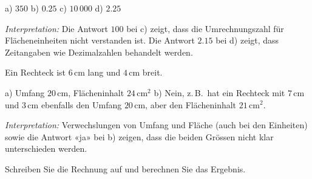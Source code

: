 \documentclass[11pt]{exam}
\newcommand{\aufgabe}[1]{%
  \needspace{8\baselineskip}%
  \renewcommand{\questionlabel}{\textbf{#1}}%
  \question}
\newcommand{\raum}[1]{\ifprintanswers\else\fillwithgrid{#1}\fi}
\newcommand{\diagnose}[1]{\par\smallskip\textit{Interpretation:} #1}
\begin{document}
\begin{questions}
\begin{solution}
  a) $350$ \quad b) $0.25$ \quad c) $10\,000$ \quad d) $2.25$
  \diagnose{Die Antwort $100$ bei c) zeigt, dass die Umrechnungszahl für
  Flächeneinheiten nicht verstanden ist. Die Antwort $2.15$ bei d) zeigt, dass
  Zeitangaben wie Dezimalzahlen behandelt werden.}
\end{solution}

\aufgabe{8.2}
Ein Rechteck ist $6$\,cm lang und $4$\,cm breit.
\begin{solution}
  a) Umfang $20$\,cm, Flächeninhalt $24$\,cm$^2$
  \qquad b) Nein, z.\,B.\ hat ein Rechteck mit $7$\,cm und $3$\,cm ebenfalls den
  Umfang $20$\,cm, aber den Flächeninhalt $21$\,cm$^2$.
  \diagnose{Verwechslungen von Umfang und Fläche (auch bei den Einheiten) sowie
  die Antwort «ja» bei b) zeigen, dass die beiden Grössen nicht klar
  unterschieden werden.}
\end{solution}
\raum{3.5cm}

\aufgabe{9.1}
Schreiben Sie die Rechnung auf und berechnen Sie das Ergebnis.
\begin{parts}

\end{parts}
\end{questions}
\end{document}
